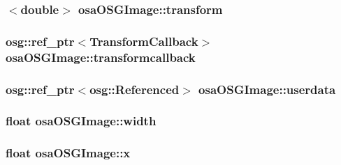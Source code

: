 \subsubsection[{transform}]{$<$double$>$ osa\+O\+S\+G\+Image\+::transform\hspace{0.3cm}{\ttfamily [protected]}}\label{classosa_o_s_g_image_a995c45a06441301f3a8845bc67621b89}
\hypertarget{classosa_o_s_g_image_a0f94bfe9322fe3d40a09706398f558f4}{}
\subsubsection[{transformcallback}]{\setlength{\rightskip}{0pt plus 5cm}osg\+::ref\+\_\+ptr$<${\bf Transform\+Callback}$>$ osa\+O\+S\+G\+Image\+::transformcallback\hspace{0.3cm}{\ttfamily [protected]}}\label{classosa_o_s_g_image_a0f94bfe9322fe3d40a09706398f558f4}
\hypertarget{classosa_o_s_g_image_a612dc68e1eccf9b96a8d2a2976a2d2de}{}
\subsubsection[{userdata}]{\setlength{\rightskip}{0pt plus 5cm}osg\+::ref\+\_\+ptr$<$osg\+::\+Referenced$>$ osa\+O\+S\+G\+Image\+::userdata\hspace{0.3cm}{\ttfamily [protected]}}\label{classosa_o_s_g_image_a612dc68e1eccf9b96a8d2a2976a2d2de}
\hypertarget{classosa_o_s_g_image_a9ba055113d2bcc4ec78db305f16fef4d}{}
\subsubsection[{width}]{\setlength{\rightskip}{0pt plus 5cm}float osa\+O\+S\+G\+Image\+::width\hspace{0.3cm}{\ttfamily [protected]}}\label{classosa_o_s_g_image_a9ba055113d2bcc4ec78db305f16fef4d}
\hypertarget{classosa_o_s_g_image_a44d3e5d8face9e82282a356e4c4c3332}{}
\subsubsection[{x}]{\setlength{\rightskip}{0pt plus 5cm}float osa\+O\+S\+G\+Image\+::x\hspace{0.3cm}{\ttfamily [protected]}}\label{classosa_o_s_g_image_a44d3e5d8face9e82282a356e4c4c3332}
\hypertarget{classosa_o_s_g_image_a6bee81116bbd53706ad648f61b74fc64}{}
